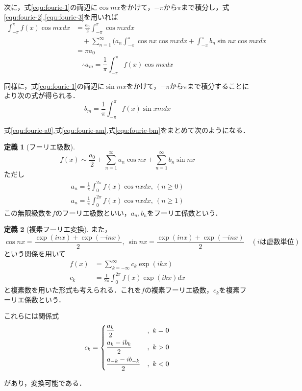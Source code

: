 \documentclass[11pt,a4paper,titlepage]{jsreport}
\theoremstyle{definition}
\newtheorem{dfn}{定義}
\begin{document}
次に，式\eqref{equ:fourie-1}の両辺に$\cos mx$をかけて，$-\pi$から$\pi$まで積分し，式\eqref{equ:fourie-2},\eqref{equ:fourie-3}を用いれば
\begin{align*}
  \int_{-\pi}^{\pi} f(x) \cos mx dx & = \frac{a_0}{2} \int_{-\pi}^{\pi} \cos mx dx                                                                   \\
                                    & \quad + \sum_{n=1}^{\infty} (a_n \int_{-\pi}^{\pi}\cos nx \cos mx dx + \int_{-\pi}^{\pi}b_n \sin nx \cos mx dx \\
                                    & = \pi a_0
\end{align*}
\begin{equation}
  \label{equ:fourie-am}
  \therefore a_m = \frac{1}{\pi}\int_{-\pi}^{\pi} f(x) \cos mx dx
\end{equation}

同様に，式\eqref{equ:fourie-1}の両辺に$\sin mx$をかけて，$-\pi$から$\pi$まで積分することにより次の式が得られる．
\begin{equation}
  \label{equ:fourie-bm}
  b_m = \frac{1}{\pi}\int_{-\pi}^{\pi} f(x)\sin xm dx
\end{equation}

式\eqref{equ:fourie-a0},式\eqref{equ:fourie-am},式\eqref{equ:fourie-bm}をまとめて次のようになる．

\begin{dfn}[フーリエ級数]
  \begin{equation*}
    f(x) \sim \frac{a_0}{2} + \sum_{n=1}^{\infty} a_n \cos nx + \sum_{n=1}^{\infty} b_n \sin nx
  \end{equation*}
  ただし
  \begin{align*}
    a_n = \frac{1}{\pi} \int_{0}^{2\pi} f(x) \cos nx dx,\ (n\geq 0) \\
    a_n = \frac{1}{\pi} \int_{0}^{2\pi} f(x) \cos nx dx,\ (n\geq 1)
  \end{align*}
  この無限級数を$f$のフーリエ級数といい，$a_n,b_n$をフーリエ係数という．
\end{dfn}

\begin{dfn}[複素フーリエ変換]
  また，$$\cos nx = \frac{\exp (inx) + \exp (-inx)}{2},\ \sin nx = \frac{\exp (inx) + \exp(-inx)}{2}\quad (iは虚数単位)$$という関係を用いて
  \begin{align*}
    f(x) & = \sum_{k=-\infty}^{\infty} c_k \exp(ikx)          \\
    c_k  & = \frac{1}{2\pi} \int_{0}^{2\pi} f(x)\exp (ikx) dx
  \end{align*}
  と複素数を用いた形式も考えられる．これを$f$の複素フーリエ級数，$c_k$を複素フーリエ係数という．

  これらには関係式
  \begin{align*}
    c_k=
    \begin{dcases}
      \frac{a_k}{2}            & ,\ k=0 \\
      \frac{a_k-ib_k}{2}       & ,\ k>0 \\
      \frac{a_{-k}-ib_{-k}}{2} & ,\ k<0
    \end{dcases}
  \end{align*}
\end{dfn}
があり，変換可能である．
\end{document}
